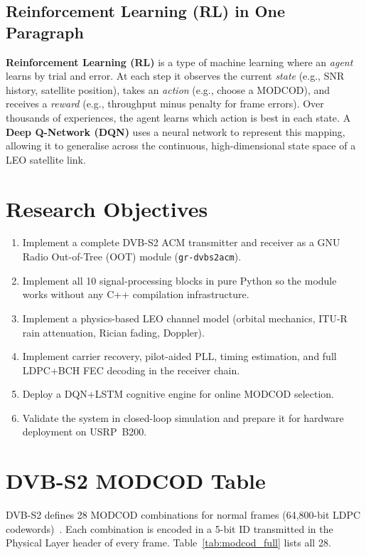 \documentclass[12pt,a4paper]{report}
\begin{document}
\subsection*{Reinforcement Learning (RL) in One Paragraph}

\textbf{Reinforcement Learning (RL)} is a type of machine learning where an
\emph{agent} learns by trial and error.  At each step it observes the current
\emph{state} (e.g., SNR history, satellite position), takes an \emph{action}
(e.g., choose a MODCOD), and receives a \emph{reward} (e.g., throughput minus
penalty for frame errors).  Over thousands of experiences, the agent learns
which action is best in each state.  A \textbf{Deep Q-Network (DQN)} uses a
neural network to represent this mapping, allowing it to generalise across the
continuous, high-dimensional state space of a LEO satellite link.

\section{Research Objectives}
\label{sec:research_obj}

\begin{enumerate}
    \item Implement a complete DVB-S2 ACM transmitter and receiver as a GNU
          Radio Out-of-Tree (OOT) module (\texttt{gr-dvbs2acm}).
    \item Implement all 10 signal-processing blocks in pure Python so the
          module works without any C++ compilation infrastructure.
    \item Implement a physics-based LEO channel model (orbital mechanics,
          ITU-R rain attenuation, Rician fading, Doppler).
    \item Implement carrier recovery, pilot-aided PLL, timing estimation,
          and full LDPC+BCH FEC decoding in the receiver chain.
    \item Deploy a DQN+LSTM cognitive engine for online MODCOD selection.
    \item Validate the system in closed-loop simulation and prepare it for
          hardware deployment on USRP~B200.
\end{enumerate}

\section{DVB-S2 MODCOD Table}

DVB-S2 defines 28 MODCOD combinations for normal frames (64,800-bit LDPC
codewords)~\cite{etsi_dvbs2}. Each combination is encoded in a 5-bit ID
transmitted in the Physical Layer header of every frame.
Table~\ref{tab:modcod_full} lists all 28.
\end{document}
